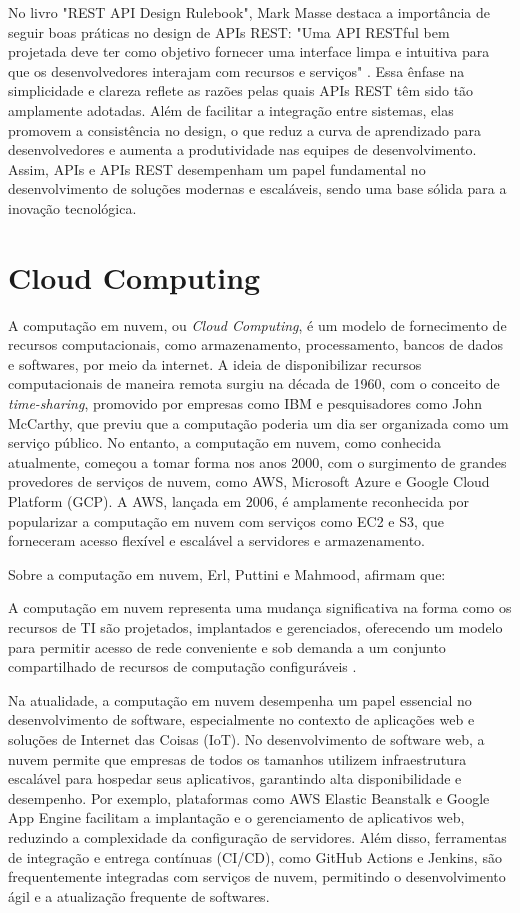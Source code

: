 No livro "REST API Design Rulebook", Mark Masse destaca a importância de seguir boas práticas no design de APIs REST: "Uma API RESTful bem projetada deve ter como objetivo fornecer uma interface limpa e intuitiva para que os desenvolvedores interajam com recursos e serviços" \cite{masse2011rest}. Essa ênfase na simplicidade e clareza reflete as razões pelas quais APIs REST têm sido tão amplamente adotadas. Além de facilitar a integração entre sistemas, elas promovem a consistência no design, o que reduz a curva de aprendizado para desenvolvedores e aumenta a produtividade nas equipes de desenvolvimento. Assim, APIs e APIs REST desempenham um papel fundamental no desenvolvimento de soluções modernas e escaláveis, sendo uma base sólida para a inovação tecnológica.

\section{Cloud Computing}

A computação em nuvem, ou \textit{Cloud Computing}, é um modelo de fornecimento de recursos computacionais, como armazenamento, processamento, bancos de dados e softwares, por meio da internet. A ideia de disponibilizar recursos computacionais de maneira remota surgiu na década de 1960, com o conceito de \textit{time-sharing}, promovido por empresas como IBM e pesquisadores como John McCarthy, que previu que a computação poderia um dia ser organizada como um serviço público. No entanto, a computação em nuvem, como conhecida atualmente, começou a tomar forma nos anos 2000, com o surgimento de grandes provedores de serviços de nuvem, como \acrfull{AWS}, Microsoft Azure e Google Cloud Platform (GCP). A AWS, lançada em 2006, é amplamente reconhecida por popularizar a computação em nuvem com serviços como \acrfull{EC2} e \acrfull{S3}, que forneceram acesso flexível e escalável a servidores e armazenamento.

Sobre a computação em nuvem, Erl, Puttini e Mahmood, afirmam que:
\begin{citacao}
	A computação em nuvem representa uma mudança significativa na forma como os recursos de TI são projetados, implantados e gerenciados, oferecendo um modelo para permitir acesso de rede conveniente e sob demanda a um conjunto compartilhado de recursos de computação configuráveis \cite{Erl2013}.
\end{citacao}

Na atualidade, a computação em nuvem desempenha um papel essencial no desenvolvimento de software, especialmente no contexto de aplicações web e soluções de Internet das Coisas (\acrshort{IoT}). No desenvolvimento de software web, a nuvem permite que empresas de todos os tamanhos utilizem infraestrutura escalável para hospedar seus aplicativos, garantindo alta disponibilidade e desempenho. Por exemplo, plataformas como AWS Elastic Beanstalk e Google App Engine facilitam a implantação e o gerenciamento de aplicativos web, reduzindo a complexidade da configuração de servidores. Além disso, ferramentas de integração e entrega contínuas (CI/CD), como GitHub Actions e Jenkins, são frequentemente integradas com serviços de nuvem, permitindo o desenvolvimento ágil e a atualização frequente de softwares.

